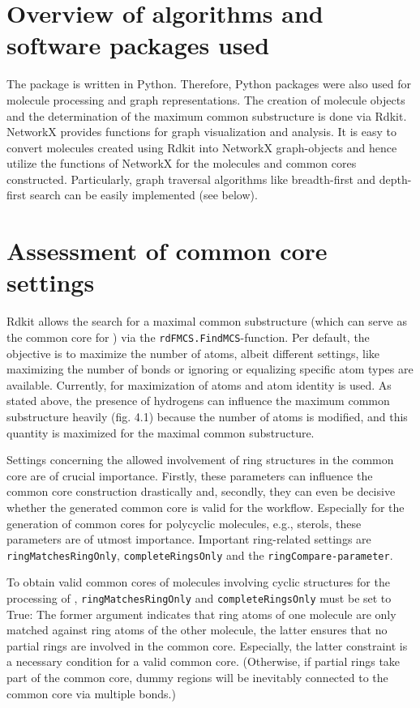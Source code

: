 \section{Overview of algorithms and software packages used}

The {\trafo} package is written in Python. Therefore, Python packages
were also used for molecule processing and graph representations.
The creation of molecule objects and the determination of the maximum
common substructure is done via Rdkit\cite{key-3}. NetworkX\cite{AricA.Hagberg.2008}
provides functions for graph visualization and analysis. It is easy to convert molecules created using Rdkit into NetworkX graph-objects
and hence utilize the functions of NetworkX for the molecules and
common cores constructed. Particularly, graph traversal algorithms
like breadth-first and depth-first search can be easily implemented
(see below).

\section{Assessment of common core settings}

Rdkit allows the search for a maximal common substructure (which can
serve as the common core for {\trafo}) via the \texttt{rdFMCS.FindMCS}-function.
Per default, the objective is to maximize the number of atoms, albeit
different settings, like maximizing the number of bonds or ignoring
or equalizing specific atom types are available. Currently, for
{\trafo} maximization of atoms and atom identity is used. As stated above, the presence of hydrogens can influence
the maximum common substructure heavily (fig. 4.1) because the number of atoms is modified, and this quantity is maximized for the maximal common substructure. 

Settings concerning the allowed involvement of ring structures in
the common core are of crucial importance. Firstly, these parameters
can influence the common core construction drastically and, secondly, they
can even be decisive whether the generated common core is valid for the
{\trafo} workflow.
Especially for the generation of common cores for polycyclic molecules, e.g., sterols, these parameters are of utmost importance.  
Important ring-related settings are \texttt{ringMatchesRingOnly}, \texttt{completeRingsOnly}
and the \texttt{ringCompare-parameter}. 

To obtain valid common cores of molecules involving cyclic structures for the processing of {\trafo}, \texttt{ringMatchesRingOnly}
and \texttt{completeRingsOnly} must be set to True: The former argument indicates
that ring atoms of one molecule are only matched against ring atoms
of the other molecule, the latter ensures that no partial rings are
involved in the common core. Especially, the latter constraint is a
necessary condition for a valid common core. (Otherwise, if partial
rings take part of the common core, dummy regions will be inevitably
connected to the common core via multiple bonds.)

